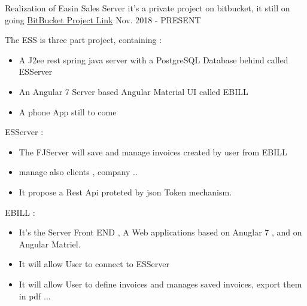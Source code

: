 


\begin{cventries}


\cventry
{Realization of Easin Sales Server } %
{it's a private project on bitbucket, it still on going } %
{ \href{https://bitbucket.org/account/user/easysoftin/projects/EAS}{BitBucket Project Link} }%
{Nov. 2018 - PRESENT} %
{ %
\begin{cvitems}
\item {The ESS is three part project, containing :}
\begin{itemize}
\item { A J2ee rest spring java server with a PostgreSQL Database behind called ESServer}
\item { An Angular 7 Server based Angular Material UI called EBILL }
\item { A phone App still to come}
\end{itemize}
\item {  ESServer : }
\begin{itemize}
\item{ The FJServer will save and manage invoices created by user from EBILL}
\item{ manage also clients , company ..}
\item{ It propose a Rest Api proteted by json Token mechanism.}
\end{itemize}
\item {EBILL :}
\begin{itemize}
\item {It's the Server Front END , A Web applications based on Anuglar 7 , and on Angular Matriel.}
\item { It will allow User to connect to ESServer}
\item { It will allow User to define invoices and manages saved invoices, export them in pdf ...}
\end{itemize}
\end{cvitems}
}


\end{cventries}
